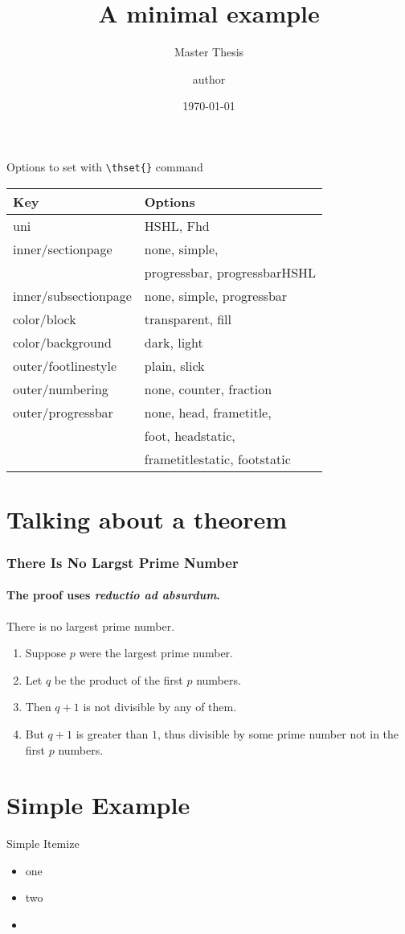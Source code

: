 \documentclass{beamer}
\title{A minimal example}
\date{\today}
\author{author}
\subtitle{Master Thesis}
\begin{document}
\maketitle
\begin{frame}{Options to set with \texttt{\textbackslash thset\{\}} command  }
\begin{table}[h]
    \centering
    \begin{tabular}{|l|l|}
        \hline
        \textbf{Key} & \textbf{Options} \\ 
        \hline
        uni & HSHL, Fhd \\ \hline
        inner/sectionpage & none, simple, \\&progressbar, progressbarHSHL \\ \hline
        inner/subsectionpage & none, simple, progressbar \\ \hline
        color/block & transparent, fill \\ \hline
        color/background & dark, light \\ \hline
        outer/footlinestyle & plain, slick \\ \hline
        outer/numbering & none, counter, fraction \\ \hline
        outer/progressbar & none, head, frametitle, \\& foot, headstatic, \\&frametitlestatic, footstatic \\ \hline
    \end{tabular}
   
\end{table}
\end{frame}

\section[Theorem]{Talking about a theorem}
\begin{frame} 
\frametitle{There Is No Largst Prime Number} 
\framesubtitle{The proof uses \textit{reductio ad absurdum}.} 
\begin{theorem}
There is no largest prime number. \end{theorem} 
\begin{enumerate} 
\item<1-| alert@1> Suppose $p$ were the largest prime number. 
\item<2-> Let $q$ be the product of the first $p$ numbers. 
\item<3-> Then $q+1$ is not divisible by any of them. 
\item<1-> But $q + 1$ is greater than $1$, thus divisible by some prime
number not in the first $p$ numbers. 
\end{enumerate}
\end{frame}
\section{Simple Example}
\begin{frame}{Simple Itemize}
\begin{itemize}
\item one
\item two
\item \inserttotalframenumber
\end{itemize}
\end{frame}




\end{document}
